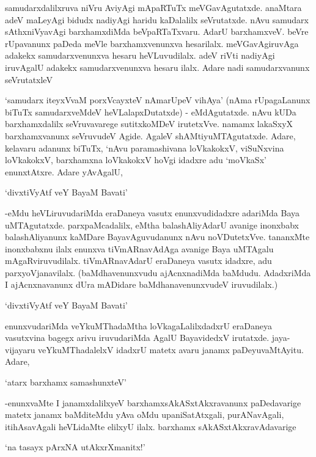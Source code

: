 samudarxdalilxruva niVru AviyAgi mApaRTuTx meVGavAgutatxde. anaMtara adeV maLeyAgi bidudx nadiyAgi haridu kaDalalilx seVrutatxde. nAvu samudarx sAthxniVyavAgi barxhamxdiMda beVpaRTaTxvaru. AdarU barxhamxveV. beVre rUpavanunx paDeda meVle barxhamxvenunxva hesarilalx. meVGavAgiruvAga adakekx samudarxvenunxva hesaru heVLuvudilalx. adeV riVti nadiyAgi iruvAgalU adakekx samudarxvenunxva hesaru ilalx. Adare nadi samudarxvanunx seVrutatxleV 

`samudarx iteyxVvaM porxVcayxteV nAmarUpeV vihAya' (nAma rUpagaLanunx biTuTx samudarxveMdeV heVLalapxDutatxde) - eMdAgutatxde. nAvu kUDa barxhamxdalilx seVruvavarege sutitxkoMDeV irutetxVve. namamx lakaSxyX barxhamxvanunx seVruvudeV Agide. AgaleV shAMtiyuMTAgutatxde. Adare, kelavaru adanunx biTuTx, `nAvu paramashivana loVkakokxV, viSuNxvina loVkakokxV, barxhamxna loVkakokxV hoVgi idadxre adu `moVkaSx' enunxtAtxre. Adare yAvAgalU, 

\begin{shloka}
`divxtiVyAtf veY BayaM Bavati'
\end{shloka}

-eMdu heVLiruvudariMda eraDaneya vasutx enunxvudidadxre adariMda Baya uMTAgutatxde. parxpaMcadalilx, eMtha balashAliyAdarU avanige inonxbabx balashAliyanunx kaMDare BayavAguvudanunx nAvu noVDutetxVve. tananxMte inonxbabxnu ilalx enunxva tiVmARnavAdAga avanige Baya uMTAgalu mAgaRviruvudilalx. tiVmARnavAdarU eraDaneya vasutx idadxre, adu parxyoVjanavilalx. (baMdhavenunxvudu ajAcnxnadiMda baMdudu. AdadxriMda I ajAcnxnavanunx dUra mADidare baMdhanavenunxvudeV iruvudilalx.)

\begin{shloka}
`divxtiVyAtf veY BayaM Bavati'
\end{shloka}

enunxvudariMda veYkuMThadaMtha loVkagaLalilxdadxrU eraDaneya vasutxvina bagegx arivu iruvudariMda AgalU BayavidedxV irutatxde. jaya-vijayaru veYkuMThadalelxV idadxrU matetx avaru janamx paDeyuvaMtAyitu. Adare,

\begin{shloka}
`atarx barxhamx samashunxteV'
\end{shloka}

-enunxvaMte I janamxdalilxyeV barxhamxsAkASxtAkxravanunx paDedavarige matetx janamx baMditeMdu yAva oMdu upaniSatAtxgali, purANavAgali, itihAsavAgali heVLidaMte elilxyU ilalx. barxhamx sAkASxtAkxravAdavarige

\begin{shloka}
`na tasayx pArxNA utAkxrXmanitx!'
\end{shloka}

